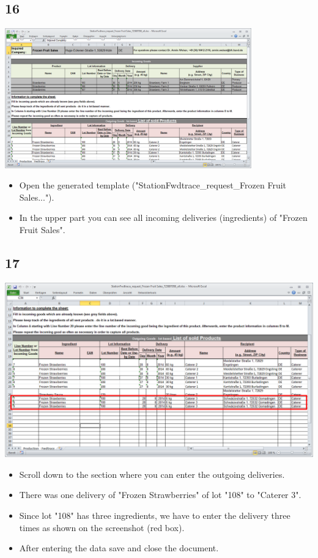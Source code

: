 \documentclass{beamer}
\begin{document}
\subsection{16}
\begin{frame}
	\begin{center}
  		\includegraphics[width=0.8\textwidth]{16.png}
	\end{center}
	\begin{itemize}
		\item Open the generated template ("StationFwdtrace\_request\_Frozen Fruit Sales...").
		\item In the upper part you can see all incoming deliveries (ingredients) of "Frozen Fruit Sales".
	\end{itemize}
\end{frame}

\subsection{17}
\begin{frame}
	\begin{center}
  		\includegraphics[height=0.55\textheight]{17.png}
	\end{center}
	\begin{itemize}
		\item Scroll down to the section where you can enter the outgoing deliveries.
		\item There was one delivery of "Frozen Strawberries" of lot "108" to "Caterer 3".
		\item Since lot "108" has three ingredients, we have to enter the delivery three times as shown on the screenshot (red box).
		\item After entering the data save and close the document.
	\end{itemize}
\end{frame}
\end{document}
